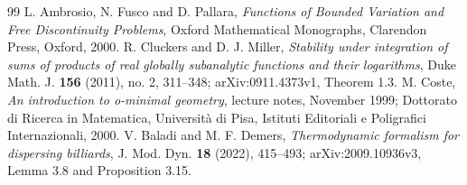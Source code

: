 \begin{thebibliography}{99}
 L. Ambrosio, N. Fusco and D. Pallara,
\emph{Functions of Bounded Variation and Free Discontinuity Problems},
Oxford Mathematical Monographs, Clarendon Press, Oxford, 2000.
 R. Cluckers and D. J. Miller,
\emph{Stability under integration of sums of products of real globally
subanalytic functions and their logarithms}, Duke Math. J.
\textbf{156} (2011), no. 2, 311--348; arXiv:0911.4373v1,
Theorem 1.3.
 M. Coste, \emph{An introduction to o-minimal geometry},
lecture notes, November 1999; Dottorato di Ricerca in Matematica,
Universit\`a di Pisa, Istituti Editoriali e Poligrafici Internazionali, 2000.
 V. Baladi and M. F. Demers,
\emph{Thermodynamic formalism for dispersing billiards},
J. Mod. Dyn. \textbf{18} (2022), 415--493;
arXiv:2009.10936v3, Lemma 3.8 and Proposition 3.15.
\end{thebibliography}
